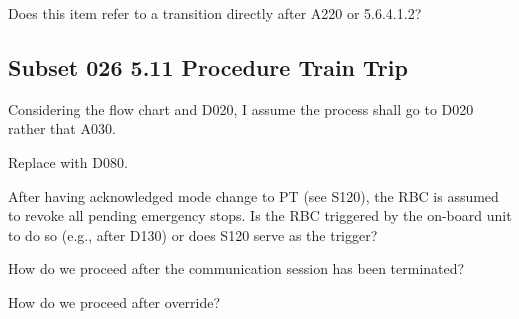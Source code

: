 \documentclass{template/openetcs_article}
\begin{document}
Does this item refer to a transition directly after A220 or 5.6.4.1.2?





\subsection{Subset 026 5.11 Procedure Train Trip}

Considering the flow chart and D020, I assume the process shall go to D020 rather that A030.

Replace with D080.

After having acknowledged mode change to PT (see S120), the RBC is assumed to revoke all pending emergency stops. Is the RBC triggered by the on-board unit to do so (e.g., after D130) or does S120 serve as the trigger?

How do we proceed after the communication session has been terminated?

How do we proceed after override?









\end{document}

